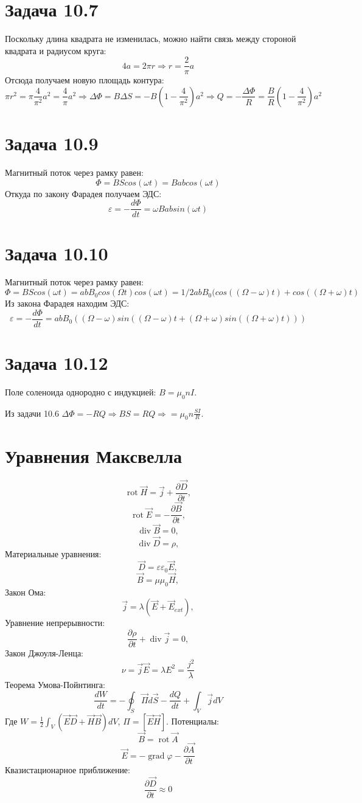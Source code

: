 \documentclass[11pt]{article}
\begin{document}
\section{Задача 10.7}
\label{sec:org5db11a7}
Поскольку длина квадрата не изменилась, можно найти связь между стороной квадрата и радиусом круга:
$$4a = 2\pi r \Rightarrow r = \frac{2}{\pi}a$$
Отсюда получаем новую площадь контура:
$$\pi r^2 = \pi\frac{4}{\pi^2}a^2 = \frac{4}{\pi}a^2 \Rightarrow \Delta\Phi = B\Delta S = -B(1 - \frac{4}{\pi^2})a^2 \Rightarrow Q = -\frac{\Delta\Phi}{R} = \frac{B}{R}\left(1 - \frac{4}{\pi^2}\right)a^2$$
\section{Задача 10.9}
\label{sec:org77e7acd}
Магнитный поток через рамку равен:
$$\Phi = BScos(\omega t) = Babcos(\omega t)$$
Откуда по закону Фарадея получаем ЭДС:
$$\varepsilon = -\frac{d\Phi}{dt} = \omega Babsin(\omega t)$$
\section{Задача 10.10}
\label{sec:orgacc963d}
Магнитный поток через рамку равен:
$$\Phi = BScos(\omega t) = abB_0cos(\Omega t)cos(\omega t) = 1/2abB_0(cos((\Omega - \omega)t) + cos((\Omega + \omega)t)$$
Из закона Фарадея находим ЭДС:
$$\varepsilon = -\frac{d\Phi}{dt} = abB_0((\Omega - \omega)sin((\Omega - \omega)t + (\Omega + \omega)sin((\Omega + \omega)t)))$$
\section{Задача 10.12}
\label{sec:org792705b}
Поле соленоида однородно с индукцией: \(B = \mu_0nI\).

Из задачи 10.6 \(\Delta\Phi = -RQ \Rightarrow BS = RQ \Rightarrow = \mu_0n\frac{SI}{R}\).
\section{Уравнения Максвелла}
\label{sec:org9d6a62e}
$$\operatorname{rot} \vec H = \vec j + \frac{\partial \vec D}{\partial t},$$
$$\operatorname{rot} \vec E = -\frac{\partial \vec B}{\partial t},$$
$$\operatorname{div} \vec B = 0,$$
$$\operatorname{div} \vec D = \rho,$$
Материальные уравнения:
$$\vec D = \varepsilon\varepsilon_0\vec E,$$
$$\vec B = \mu\mu_0\vec H,$$
Закон Ома:
$$\vec j = \lambda(\vec E + \vec E_{ext}),$$
Уравнение непрерывности:
$$\frac{\partial\rho}{\partial t} + \operatorname{div}\vec j = 0,$$
Закон Джоуля-Ленца:
$$\nu = \vec j \vec E = \lambda E^2 = \frac{j^2}{\lambda}$$
Теорема Умова-Пойнтинга:
$$\frac{dW}{dt} = -\oint_S\vec\Pi d\vec S - \frac{dQ}{dt} + \int_V \vec j dV$$
Где \(W = \frac{1}2\int_V(\vec E\vec D + \vec H\vec B)dV\), \(\Pi = [\vec E\vec H]\).
Потенциалы:
$$\vec B = \operatorname{rot}\vec A$$
$$\vec E = -\operatorname{grad}\varphi - \frac{\partial\vec A}{\partial t}$$
Квазистационарное приближение:
$$\frac{\partial \vec D}{\partial t} \approx 0$$
\end{document}
